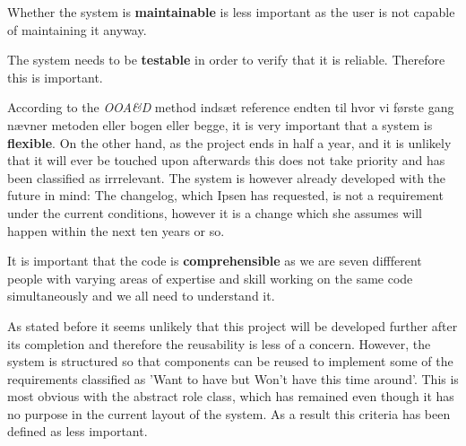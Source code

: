 Whether the system is \textbf{maintainable} is less important as the user is not capable of maintaining it anyway.

The system needs to be \textbf{testable} in order to verify that it is reliable.
Therefore this is important.

According to the \textit{OOA\&D} method {\color{red}indsæt reference endten til hvor vi første gang nævner metoden eller bogen eller begge}, it is very important that a system is \textbf{flexible}.
On the other hand, as the project ends in half a year, and it is unlikely that it will ever be touched upon afterwards this does not take priority and has been classified as irrrelevant.
The system is however already developed with the future in mind: The changelog, which Ipsen has requested, is not a requirement under the current conditions, however it is a change which she assumes will happen within the next ten years or so.

It is important that the code is \textbf{comprehensible} as we are seven diffferent people with varying areas of expertise and skill working on the same code simultaneously and we all need to understand it.

As stated before it seems unlikely that this project will be developed further after its completion and therefore the reusability is less of a concern.
However, the system is structured so that components can be reused to implement some of the requirements classified as 'Want to have but Won't have this time around'.
This is most obvious with the abstract role class, which has remained even though it has no purpose in the current layout of the system.
As a result this criteria has been defined as less important.

